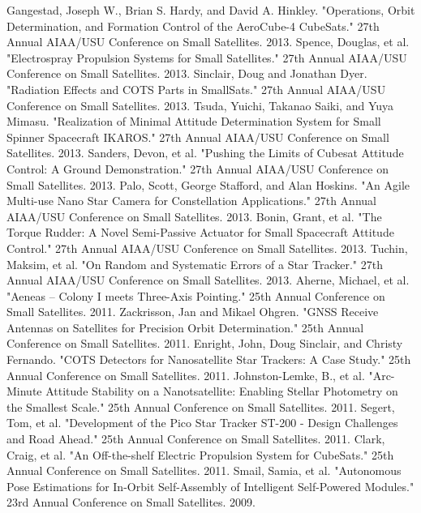 \begin{thebibliography}{99}
 Gangestad, Joseph W., Brian S. Hardy, and David A. Hinkley. "Operations, Orbit Determination, and Formation Control of the AeroCube-4 CubeSats." 27th Annual AIAA/USU Conference on Small Satellites. 2013.
 Spence, Douglas, et al. "Electrospray Propulsion Systems for Small Satellites." 27th Annual AIAA/USU Conference on Small Satellites. 2013.
 Sinclair, Doug and Jonathan Dyer. "Radiation Effects and COTS Parts in SmallSats." 27th Annual AIAA/USU Conference on Small Satellites. 2013.
 Tsuda, Yuichi, Takanao Saiki, and Yuya Mimasu. "Realization of Minimal Attitude Determination System for Small Spinner Spacecraft IKAROS." 27th Annual AIAA/USU Conference on Small Satellites. 2013.
 Sanders, Devon, et al. "Pushing the Limits of Cubesat Attitude Control: A Ground Demonstration." 27th Annual AIAA/USU Conference on Small Satellites. 2013.
 Palo, Scott, George Stafford, and Alan Hoskins. "An Agile Multi-use Nano Star Camera for Constellation Applications." 27th Annual AIAA/USU Conference on Small Satellites. 2013.
 Bonin, Grant, et al. "The Torque Rudder: A Novel Semi-Passive Actuator for Small Spacecraft Attitude Control." 27th Annual AIAA/USU Conference on Small Satellites. 2013.
 Tuchin, Maksim, et al. "On Random and Systematic Errors of a Star Tracker." 27th Annual AIAA/USU Conference on Small Satellites. 2013.
 Aherne, Michael, et al. "Aeneas -- Colony I meets Three-Axis Pointing." 25th Annual Conference on Small Satellites. 2011.
 Zackrisson, Jan and Mikael Ohgren. "GNSS Receive Antennas on Satellites for Precision Orbit Determination." 25th Annual Conference on Small Satellites. 2011.
 Enright, John, Doug Sinclair, and Christy Fernando. "COTS Detectors for Nanosatellite Star Trackers: A Case Study." 25th Annual Conference on Small Satellites. 2011.
 Johnston-Lemke, B., et al. "Arc-Minute Attitude Stability on a Nanotsatellite: Enabling Stellar Photometry on the Smallest Scale." 25th Annual Conference on Small Satellites. 2011.
 Segert, Tom, et al. "Development of the Pico Star Tracker ST-200 - Design Challenges and Road Ahead." 25th Annual Conference on Small Satellites. 2011.
 Clark, Craig, et al. "An Off-the-shelf Electric Propulsion System for CubeSats." 25th Annual Conference on Small Satellites. 2011.
 Smail, Samia, et al. "Autonomous Pose Estimations for In-Orbit Self-Assembly of Intelligent Self-Powered Modules." 23rd Annual Conference on Small Satellites. 2009.

\end{thebibliography}
